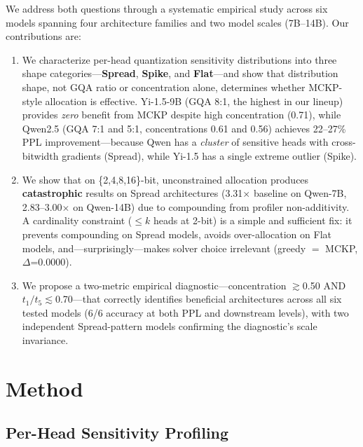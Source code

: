 \documentclass[11pt,a4paper]{article}
\newcommand{\ttf}{t_1/t_5}
\begin{document}
We address both questions through a systematic empirical study across six models spanning four architecture families and two model scales (7B--14B).
Our contributions are:

\begin{enumerate}
\item We characterize per-head quantization sensitivity distributions into three shape categories---\textbf{Spread}, \textbf{Spike}, and \textbf{Flat}---and show that distribution shape, not GQA ratio or concentration alone, determines whether MCKP-style allocation is effective.
      Yi-1.5-9B (GQA 8:1, the highest in our lineup) provides \emph{zero} benefit from MCKP despite high concentration (0.71), while Qwen2.5 (GQA 7:1 and 5:1, concentrations 0.61 and 0.56) achieves 22--27\% PPL improvement---because Qwen has a \emph{cluster} of sensitive heads with cross-bitwidth gradients (Spread), while Yi-1.5 has a single extreme outlier (Spike).

\item We show that on \{2,4,8,16\}-bit, unconstrained allocation produces \textbf{catastrophic} results on Spread architectures (3.31$\times$ baseline on Qwen-7B, 2.83--3.00$\times$ on Qwen-14B) due to compounding from profiler non-additivity.
      A cardinality constraint ($\leq k$ heads at 2-bit) is a simple and sufficient fix: it prevents compounding on Spread models, avoids over-allocation on Flat models, and---surprisingly---makes solver choice irrelevant (greedy $=$ MCKP, $\Delta$=0.0000).

\item We propose a two-metric empirical diagnostic---concentration $\gtrsim$0.50 AND $\ttf\lesssim$0.70---that correctly identifies beneficial architectures across all six tested models (6/6 accuracy at both PPL and downstream levels), with two independent Spread-pattern models confirming the diagnostic's scale invariance.
\end{enumerate}

\section{Method}

\subsection{Per-Head Sensitivity Profiling}
\end{document}
